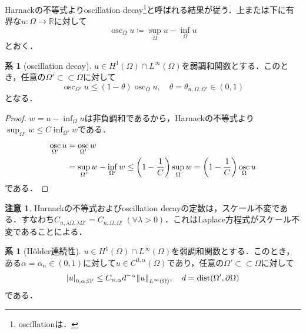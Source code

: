 \documentclass[a4paper]{ltjsarticle}
\newcommand{\Rset}{\mathbb{R}}
\newcommand{\Om}{\Omega}
\newcommand{\pOm}{\partial\Omega}
\newcommand{\ssubset}{\subset\subset}
\newcommand{\1}{\mathbbm{1}}
\DeclareMathOperator{\dist}{\mathrm{dist}}
\DeclareMathOperator*{\osc}{\mathrm{osc}}
\numberwithin{equation}{section}
\theoremstyle{definition}
\newtheorem{cor}[thm]{系}
\newtheorem{rmk}[thm]{注意}
\begin{document}
Harnackの不等式よりoscillation decay\footnote{oscillationは．}と呼ばれる結果が従う．上または下に有界な$u\colon \Om\to \Rset$に対して
\begin{equation}
    \osc_{\Om}u\coloneqq \sup_{\Om}u-\inf_{\Om}u 
\end{equation}
とおく．
\begin{cor}[oscillation decay]
    $u\in H^1(\Om)\cap L^\infty(\Om)$を弱調和関数とする．このとき，任意の$\Om'\ssubset \Om$に対して
    \begin{equation}
        \osc_{\Om'}u\leq (1-\theta)\osc_{\Om}u,\quad \theta=\theta_{n,\Om,\Om'}\in(0,1)
    \end{equation}
    となる．
\end{cor}
\begin{proof}
    $w=u-\inf_{\Om}u$は非負調和であるから，Harnackの不等式より$\sup_{\Om'}w\leq C\inf_{\Om'}w$である．
    \begin{align}
        \osc_{\Om'}u&=\osc_{\Om'}w\\
        &=\sup_{\Om'}w-\inf_{\Om'}w\leq \qty(1-\frac{1}{C})\sup_{\Om}w=\qty(1-\frac{1}{C})\osc_{\Om}u 
    \end{align}
    である．
\end{proof}
\begin{rmk}\label{rmk:scale_invariance_of_const}
    Harnackの不等式およびoscillation decayの定数は，スケール不変である．すなわち$C_{n,\lambda\Om,\lambda\Om'}=C_{n,\Om,\Om'}\ (\forall \lambda>0)$．これはLaplace方程式がスケール不変であることによる．
\end{rmk}
\begin{cor}[Hölder連続性]
    $u\in H^1(\Om)\cap L^\infty(\Om)$を弱調和関数とする．このとき，ある$\alpha=\alpha_n\in (0,1)$に対して$u\in C^{0,\alpha}(\Om)$であり，任意の$\Om'\ssubset \Om$に対して
    \begin{equation}
        \abs{u}_{0,\alpha;\Om'}\leq C_{n,\alpha}d^{-\alpha}\norm{u}_{L^\infty(\Om)},\quad d=\dist(\Om',\pOm)
    \end{equation}
    である．
\end{cor}
\end{document}
